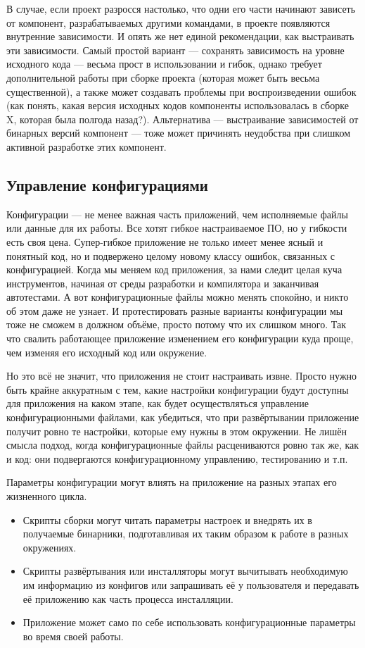 \documentclass{../../text-style}
\begin{document}
В случае, если проект разросся настолько, что одни его части начинают зависеть от компонент, разрабатываемых другими командами, в проекте появляются внутренние зависимости. И опять же нет единой рекомендации, как выстраивать эти зависимости. Самый простой вариант --- сохранять зависимость на уровне исходного кода --- весьма прост в использовании и гибок, однако требует дополнительной работы при сборке проекта (которая может быть весьма существенной), а также может создавать проблемы при воспроизведении ошибок (как понять, какая версия исходных кодов компоненты использовалась в сборке X, которая была полгода назад?). Альтернатива --- выстраивание зависимостей от бинарных версий компонент --- тоже может причинять неудобства при слишком активной разработке этих компонент.

\subsection{Управление конфигурациями}

Конфигурации --- не менее важная часть приложений, чем исполняемые файлы или данные для их работы. Все хотят гибкое настраиваемое ПО, но у гибкости есть своя цена. Супер-гибкое приложение не только имеет менее ясный и понятный код, но и подвержено целому новому классу ошибок, связанных с конфигурацией. Когда мы меняем код приложения, за нами следит целая куча инструментов, начиная от среды разработки и компилятора и заканчивая автотестами. А вот конфигурационные файлы можно менять спокойно, и никто об этом даже не узнает. И протестировать разные варианты конфигурации мы тоже не сможем в должном объёме, просто потому что их слишком много. Так что свалить работающее приложение изменением его конфигурации куда проще, чем изменяя его исходный код или окружение.

Но это всё не значит, что приложения не стоит настраивать извне. Просто нужно быть крайне аккуратным с тем, какие настройки конфигурации будут доступны для приложения на каком этапе, как будет осуществляться управление конфигурационными файлами, как убедиться, что при развёртывании приложение получит ровно те настройки, которые ему нужны в этом окружении. Не лишён смысла подход, когда конфигурационные файлы расцениваются ровно так же, как и код: они подвергаются конфигурационному управлению, тестированию и т.п.

Параметры конфигурации могут влиять на приложение на разных этапах его жизненного цикла.

\begin{itemize}
    \item Скрипты сборки могут читать параметры настроек и внедрять их в получаемые бинарники, подготавливая их таким образом к работе в разных окружениях.
    \item Скрипты развёртывания или инсталляторы могут вычитывать необходимую им информацию из конфигов или запрашивать её у пользователя и передавать её приложению как часть процесса инсталляции.
    \item Приложение может само по себе использовать конфигурационные параметры во время своей работы.
\end{itemize}
\end{document}
